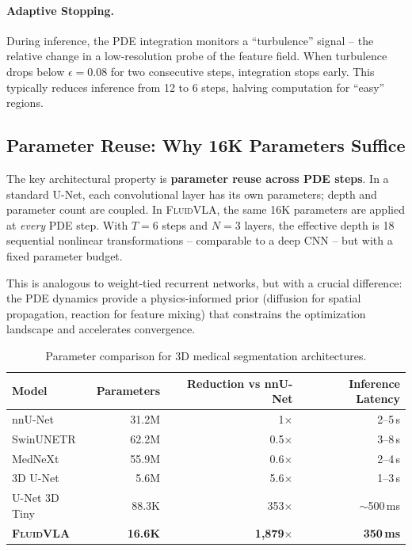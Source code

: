 \documentclass{article}
\newcommand{\fluidvla}{\textsc{FluidVLA}}
\begin{document}
\paragraph{Adaptive Stopping.}
During inference, the PDE integration monitors a ``turbulence'' signal -- the relative change in a low-resolution probe of the feature field. When turbulence drops below $\epsilon = 0.08$ for two consecutive steps, integration stops early. This typically reduces inference from 12 to 6 steps, halving computation for ``easy'' regions.

\subsection{Parameter Reuse: Why 16K Parameters Suffice}

The key architectural property is \textbf{parameter reuse across PDE steps}. In a standard U-Net, each convolutional layer has its own parameters; depth and parameter count are coupled. In \fluidvla{}, the same 16K parameters are applied at \emph{every} PDE step. With $T=6$ steps and $N=3$ layers, the effective depth is 18 sequential nonlinear transformations -- comparable to a deep CNN -- but with a fixed parameter budget.

This is analogous to weight-tied recurrent networks, but with a crucial difference: the PDE dynamics provide a physics-informed prior (diffusion for spatial propagation, reaction for feature mixing) that constrains the optimization landscape and accelerates convergence.

\begin{table}[t]
\centering
\caption{Parameter comparison for 3D medical segmentation architectures.}
\label{tab:params}
\begin{tabular}{lrrr}
\toprule
\textbf{Model} & \textbf{Parameters} & \textbf{Reduction vs nnU-Net} & \textbf{Inference Latency} \\
\midrule
nnU-Net~\cite{isensee2021nnunet} & 31.2M & 1$\times$ & 2--5\,s \\
SwinUNETR~\cite{hatamizadeh2022swinunetr} & 62.2M & 0.5$\times$ & 3--8\,s \\
MedNeXt~\cite{roy2023mednext} & 55.9M & 0.6$\times$ & 2--4\,s \\
3D U-Net~\cite{cciccek20163dunet} & 5.6M & 5.6$\times$ & 1--3\,s \\
U-Net 3D Tiny & 88.3K & 353$\times$ & $\sim$500\,ms \\
\midrule
\textbf{\fluidvla{}} & \textbf{16.6K} & \textbf{1,879$\times$} & \textbf{350\,ms} \\
\bottomrule
\end{tabular}
\end{table}
\end{document}
